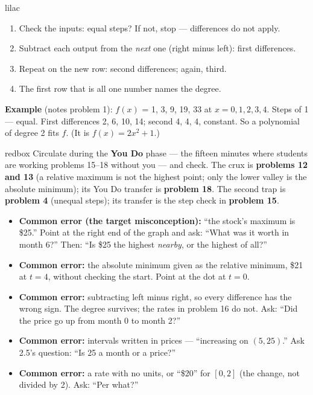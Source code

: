 \documentclass[10pt]{article}
\begin{document}
\begin{skillbox}{lilac}
\begin{minipage}[t]{0.48\linewidth}
\begin{enumerate}[itemsep=2pt]
  \item Check the inputs: equal steps? If not, stop --- differences do not apply.
  \item Subtract each output from the \emph{next} one (right minus left): first differences.
  \item Repeat on the new row: second differences; again, third.
  \item The first row that is all one number names the degree.
\end{enumerate}
\end{minipage}\hfill
\begin{minipage}[t]{0.48\linewidth}
\textbf{Example} (notes problem 1): $f(x)$ = 1, 3, 9, 19, 33 at $x = 0, 1, 2, 3, 4$.
Steps of 1 --- equal. First differences 2, 6, 10, 14; second 4, 4, 4, constant. So a polynomial
of degree 2 fits $f$. (It is $f(x) = 2x^2 + 1$.)
\end{minipage}
\end{skillbox}

\begin{skillbox}{redbox}
Circulate during the \textbf{You Do} phase --- the fifteen minutes where students are working
problems 15--18 without you --- and check. The crux is \textbf{problems 12 and 13} (a relative
maximum is not the highest point; only the lower valley is the absolute minimum); its You Do
transfer is \textbf{problem 18}. The second trap is \textbf{problem 4} (unequal steps); its
transfer is the step check in \textbf{problem 15}.
\begin{itemize}
  \item \textbf{Common error (the target misconception):} ``the stock's maximum is \$25.''
        Point at the right end of the graph and ask: ``What was it worth in month 6?'' Then:
        ``Is \$25 the highest \emph{nearby}, or the highest of all?''
  \item \textbf{Common error:} the absolute minimum given as the relative minimum, \$21 at
        $t = 4$, without checking the start. Point at the dot at $t = 0$.
  \item \textbf{Common error:} subtracting left minus right, so every difference has the wrong
        sign. The degree survives; the rates in problem 16 do not. Ask: ``Did the price go up
        from month 0 to month 2?''
  \item \textbf{Common error:} intervals written in prices --- ``increasing on $(5, 25)$.'' Ask
        2.5's question: ``Is 25 a month or a price?''
  \item \textbf{Common error:} a rate with no units, or ``\$20'' for $[0, 2]$ (the change, not
        divided by 2). Ask: ``Per what?''
\end{itemize}
\end{skillbox}
\end{document}
